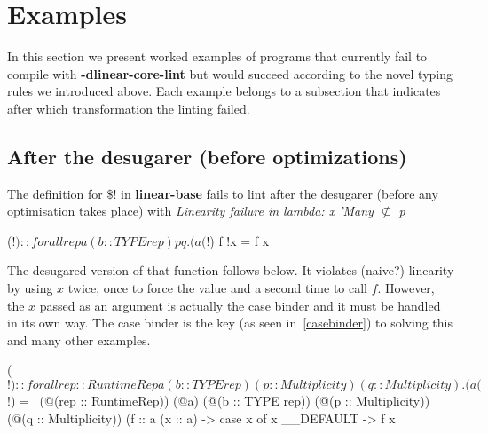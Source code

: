 \documentclass[]{lwnovathesis}
\begin{document}






\section{Examples\label{examples}}

In this section we present worked examples of programs that currently fail to
compile with \textbf{-dlinear-core-lint} but would succeed according to the
novel typing rules we introduced above. Each example belongs to a subsection
that indicates after which transformation the linting failed.

\subsection{After the desugarer (before optimizations)}

The definition for $\$!$ in \textbf{linear-base}\cite{linearbase} fails to lint after the
desugarer (before any optimisation takes place) with \emph{Linearity failure in
lambda: x 'Many $\not\subseteq$ p}
\begin{code}
($!) :: forall {rep} a (b :: TYPE rep) p q. (a %
($!) f !x = f x
\end{code}

The desugared version of that function follows below. It violates (naive?)
linearity by using $x$ twice, once to force the value and a second time to call
$f$. However, the $x$ passed as an argument is actually the case binder and it
must be handled in its own way. The case binder is the key (as seen
in~\ref{casebinder}) to solving this
and many other examples.
\begin{code}
($!)
  :: forall {rep :: RuntimeRep} a (b :: TYPE rep) (p :: Multiplicity)
            (q :: Multiplicity).
     (a %
($!)
  = \ (@(rep :: RuntimeRep))
      (@a)
      (@(b :: TYPE rep))
      (@(p :: Multiplicity))
      (@(q :: Multiplicity))
      (f :: a %
      (x :: a) ->
      case x of x { __DEFAULT -> f x }
\end{code}
\end{document}
